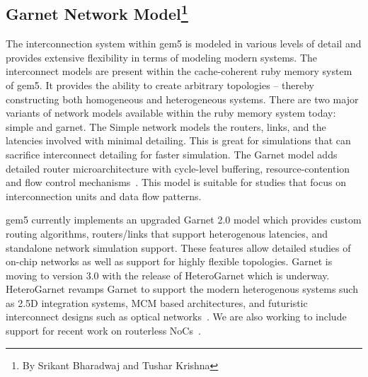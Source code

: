 \subsection[Garnet Network Model]{Garnet Network Model\footnote{By Srikant Bharadwaj and Tushar Krishna}}

The interconnection system within gem5 is modeled in various levels of detail and provides extensive
flexibility in terms of modeling modern systems.
The interconnect models are present within the cache-coherent ruby memory system of gem5.
It provides the ability to create arbitrary topologies – thereby constructing both homogeneous and heterogeneous systems.
There are two major variants of network models available within the ruby memory system today: simple and garnet.
The Simple network models the routers, links, and the latencies involved with minimal detailing.
This is great for simulations that can sacrifice interconnect detailing for faster simulation.
The Garnet model adds detailed router microarchitecture with cycle-level buffering, resource-contention and flow control mechanisms~\cite{garnet-2}.
This model is suitable for studies that focus on interconnection units and data flow patterns.

gem5 currently implements an upgraded Garnet 2.0 model which provides custom routing algorithms, routers/links that support heterogenous latencies, and standalone network simulation support.
These features allow detailed studies of on-chip networks as well as support for highly flexible topologies.
Garnet is moving to version 3.0 with the release of HeteroGarnet which is underway.
HeteroGarnet revamps Garnet to support the modern heterogenous systems such as 2.5D integration systems, MCM based architectures, and futuristic interconnect designs such as optical networks~\cite{kite}.
We are also working to include support for recent work on routerless NoCs~\cite{AlazemiABC18, LinPPC20}.

